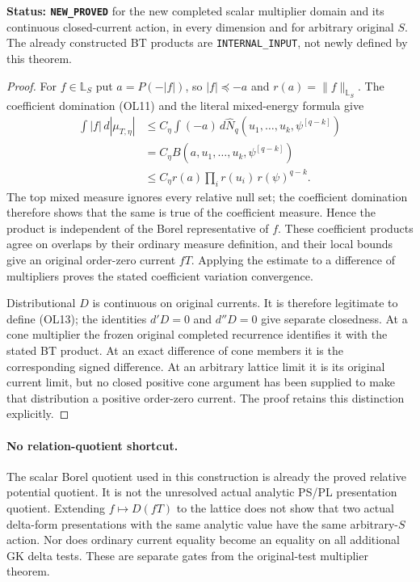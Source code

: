 \documentclass[11pt,a4paper]{article}
\numberwithin{equation}{section}
\theoremstyle{definition}
\theoremstyle{remark}
\begin{document}
\noindent\textbf{Status: \texttt{NEW\_PROVED}} for the
new completed scalar multiplier domain and its continuous
closed-current action, in every dimension and for arbitrary
original $S$.  The already constructed BT products are
\texttt{INTERNAL\_INPUT}, not newly defined by this theorem.

\begin{proof}
For $f\in\mathbb L_S$ put $a=P(-|f|)$, so
$|f|\preceq-a$ and $r(a)=\|f\|_{\mathbb L_S}$.
The coefficient domination \textup{(OL11)} and the
literal mixed-energy formula give
\[
 \begin{split}
 \int|f|\,d|\mu_{T,\eta}|
 &\le C_\eta\int(-a)\,
            d\widehat N_q(u_1,\ldots,u_k,\psi^{[q-k]})\\
 &=C_\eta B(a,u_1,\ldots,u_k,\psi^{[q-k]})\\
 &\le C_\eta r(a)\prod_i r(u_i)\,r(\psi)^{q-k}.
 \end{split}
\]
The top mixed measure ignores every relative null set;
the coefficient domination therefore shows that the
same is true of the coefficient measure.  Hence the
product is independent of the Borel representative of
$f$.  These coefficient products agree on overlaps by
their ordinary measure definition, and their local
bounds give an original order-zero current $fT$.
Applying the estimate to a difference of multipliers
proves the stated coefficient variation convergence.

Distributional $D$ is continuous on original currents.
It is therefore legitimate to define \textup{(OL13)};
the identities $d'D=0$ and $d''D=0$ give separate
closedness.  At a cone multiplier the frozen original
completed recurrence identifies it with the stated BT
product.  At an exact difference of cone members it is
the corresponding signed difference.  At an arbitrary
lattice limit it is its original current limit, but
no closed positive cone argument has been supplied to
make that distribution a positive order-zero current.
The proof retains this distinction explicitly.
\end{proof}

\paragraph{No relation-quotient shortcut.}
The scalar Borel quotient used in this construction is
already the proved relative potential quotient.  It is
not the unresolved actual analytic PS/PL presentation
quotient.  Extending $f\mapsto D(fT)$ to the lattice
does not show that two actual delta-form presentations
with the same analytic value have the same arbitrary-$S$
action.  Nor does ordinary current equality become an
equality on all additional GK delta tests.  These are
separate gates from the original-test multiplier theorem.
\end{document}
